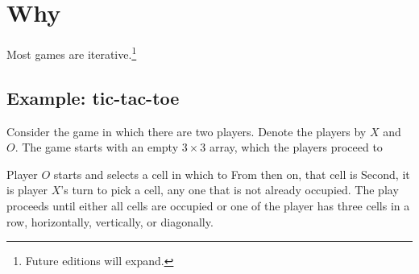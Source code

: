 

\section*{Why}

Most games are iterative.\footnote{Future editions will expand.}

\subsection*{Example: tic-tac-toe}

Consider the game  in which there are two players.
Denote the players by $X$ and $O$.
The game starts with an empty $3 \times 3$ array, which the players proceed to 

Player $O$ starts and selects a cell in which to 
From then on, that cell is 
Second, it is player $X$'s turn to pick a cell, any one that is not already occupied.
The play proceeds until either all cells are occupied or one of the player has three cells in a row, horizontally, vertically, or diagonally.

\blankpage
